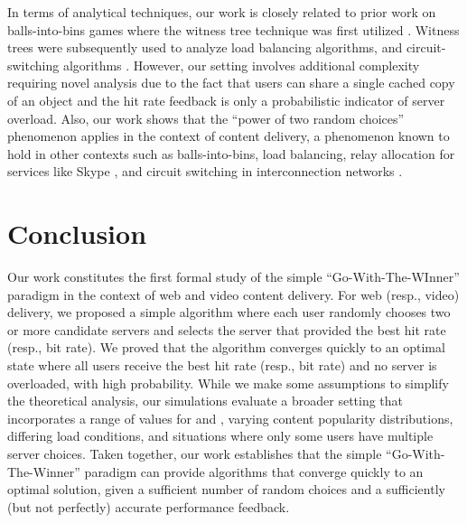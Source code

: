 \documentclass[conference]{IEEEtran}
\newcommand{\comment}[1]{}
\begin{document}
In terms of analytical techniques, our work is closely related to  prior work on balls-into-bins games where the witness tree technique was first utilized \cite{mitzenmacherRS2001}. Witness trees were subsequently used to analyze load balancing algorithms, and circuit-switching algorithms \cite{cole1998randomized}. However, our setting involves additional complexity requiring novel analysis due to the fact that users can share a single cached copy of an object and the hit rate feedback is only a probabilistic indicator of server overload. Also,  our work shows that the ``power of two random choices'' phenomenon  applies in the context of content delivery, a phenomenon known to hold in other contexts such as  balls-into-bins, load balancing, relay allocation for services like Skype \cite{Nguyen:2008}, and circuit switching in interconnection networks \cite{mitzenmacherRS2001}. 
\comment{
There are also parallels between our work on bit rate maximization for video delivery and the recent work on throughput maximization in multi-path communication \cite{Peter:2007}. Similar in spirit to our work, the work on multi-path communication concludes that coordinated rate control over multiple randomly selected paths provides optimal throughput and is significant better than uncoordinated control where rates are determined independently over each single path. However, our work also evolves techniques for determining the convergence rate that is potentially applicable in these domains.
 }
 
 \section{Conclusion}
 Our work constitutes the first formal study of the simple ``Go-With-The-WInner'' paradigm in the context of web and video content delivery.  For web (resp., video) delivery, we proposed a simple algorithm where each user randomly chooses two or more candidate servers and selects the server that provided the best hit rate (resp., bit rate). We proved that the algorithm converges quickly to an optimal state where all users receive the best hit rate (resp., bit rate) and no server is overloaded, with high probability.  While we make some assumptions to simplify the theoretical analysis, our simulations evaluate a broader setting that incorporates a range of values for  and , varying  content popularity distributions, differing load conditions, and situations where only some users have multiple server choices. Taken together, our work establishes that the simple ``Go-With-The-Winner'' paradigm can provide algorithms that converge quickly to an optimal solution, given a sufficient number of random choices and a sufficiently (but not perfectly) accurate performance feedback.
 
\end{document}
